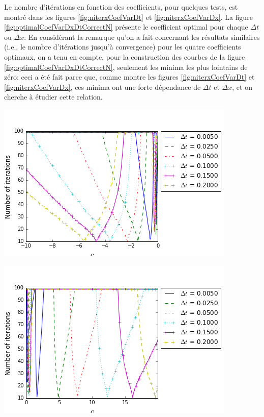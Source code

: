 \indent Le nombre d'itérations en fonction des coefficients, pour quelques tests, est montré dans les figures \ref{fig:niterxCoefVarDt} et \ref{fig:niterxCoefVarDx}. La figure \ref{fig:optimalCoefVarDxDtCorrectN} présente le coefficient optimal pour chaque $\Delta t$ ou $\Delta x$. En considérant la remarque qu'on a fait concernant les résultats similaires (i.e., le nombre d'itérations jusqu'à convergence) pour les quatre coefficients optimaux, on a tenu en compte, pour la construction des courbes de la figure \ref{fig:optimalCoefVarDxDtCorrectN}, seulement les minima les plus lointains de zéro: ceci a été fait parce que, comme montre les figures \ref{fig:niterxCoefVarDt} et \ref{fig:niterxCoefVarDx}, ces minima ont une forte dépendance de $\Delta t$ et $\Delta x$, et on cherche à étudier cette relation.

\begingroup
\noindent
\begin{minipage}{.45\linewidth}
	\includegraphics[scale=.45]{figures/FinalFigures/NiterxCoefVarDtdx250FinalVersionNMarshal.png}
\end{minipage}
\hfill
\begin{minipage}{.45\linewidth}
	\includegraphics[scale=.45]{figures/FinalFigures/NiterxCoefVarDtdx250FinalVersionPMarshal.png}
\end{minipage}
\endgroup

